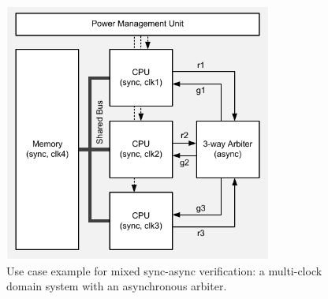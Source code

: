 
\begin{figure}[!t]
\begin{center}

\includegraphics[width=8.8cm]{figures/fig_system}

\caption{
Use case example for mixed sync-async verification: a multi-clock domain system with an asynchronous arbiter.
}

\label{fig_system}
\end{center}

\end{figure}
